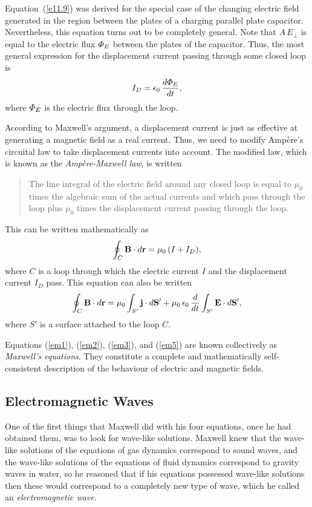 Equation~(\ref{e11.9}) was derived for the special case of the changing electric
field generated in the region
between the plates of a charging parallel plate capacitor. Nevertheless, this equation turns out to be completely general. Note that
$A\,E_\perp$ is equal to the electric flux ${\mit\Phi}_E$ between the plates of
the capacitor. Thus, the most general expression for the displacement current
passing through some closed loop is
\begin{equation}
I_D = \epsilon_0\,\frac{d{\mit\Phi}_E}{d t},
\end{equation}
where ${\mit\Phi}_E$ is the electric flux through the loop. 

According to Maxwell's argument, a displacement current is just as effective at generating a
magnetic field as a real current. Thus, we need to modify Amp\`{e}re's
circuital law to take displacement currents into account. The modified
law, which is known as the {\em Amp\`{e}re-Maxwell law}, is written
\begin{quote}
{\sf The line integral of the electric field around any closed loop is
equal to $\mu_0$ times the algebraic sum of the actual currents
and which pass
through the loop plus $\mu_0$ times the displacement current 
passing through the
loop.}
\end{quote}
This can be written mathematically as
\begin{equation}
\oint_C {\bf B}\cdot d{\bf r} = \mu_0\,(I + I_D),
\end{equation}
where $C$ is a loop through which the electric current $I$ and the 
displacement current $I_D$ pass. 
This equation can also be written
\begin{equation}\label{em5}
\oint_C {\bf B}\cdot d{\bf r} = \mu_0\int_{S'} {\bf j} \cdot d{\bf S}'
+ \mu_0\,\epsilon_0\,\frac{d}{dt}\int_{S'} {\bf E}\cdot d{\bf S}',
\end{equation}
where $S'$ is a surface attached to the loop $C$.

Equations (\ref{em1}), (\ref{em2}), (\ref{em3}), and (\ref{em5}) are known collectively as
{\em Maxwell's equations}. They constitute a complete and mathematically
self-consistent description of the behaviour of electric and magnetic
fields. 

\subsection{Electromagnetic Waves}
One of the first 
things that Maxwell did with his four equations, once he had obtained
them, was to look for wave-like solutions. 
Maxwell knew that the wave-like solutions of the equations of gas dynamics
correspond to sound waves, and the wave-like solutions of the
equations of fluid dynamics correspond to gravity waves in water, so
he reasoned that if his equations possessed wave-like solutions then  these
would correspond to a completely
new type of wave, which he  called an {\em electromagnetic wave}. 


